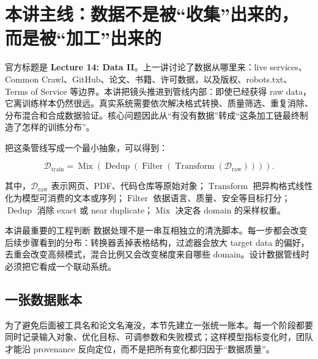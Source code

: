 \section{本讲主线：数据不是被“收集”出来的，而是被“加工”出来的}

官方标题是 \textbf{Lecture 14: Data II}。上一讲讨论了数据从哪里来：live services、Common Crawl、GitHub、论文、书籍、许可数据，以及版权、robots.txt、Terms of Service 等边界。本讲把镜头推进到管线内部：即使已经获得 raw data，它离训练样本仍然很远。真实系统需要依次解决格式转换、质量筛选、重复消除、分布混合和合成数据验证。核心问题因此从“有没有数据”转成“这条加工链最终制造了怎样的训练分布”。

把这条管线写成一个最小抽象，可以得到：

$$
\mathcal{D}_{\mathrm{train}}
=\operatorname{Mix}\!\left(
\operatorname{Dedup}\!\left(
\operatorname{Filter}\!\left(
\operatorname{Transform}(\mathcal{D}_{\mathrm{raw}})
\right)\right)\right).
$$

其中，$\mathcal{D}_{\mathrm{raw}}$ 表示网页、PDF、代码仓库等原始对象；$\operatorname{Transform}$ 把异构格式线性化为模型可消费的文本或序列；$\operatorname{Filter}$ 依据语言、质量、安全等目标打分；$\operatorname{Dedup}$ 消除 exact 或 near duplicate；$\operatorname{Mix}$ 决定各 domain 的采样权重。

\begin{importantbox}{本讲最重要的工程判断}
数据处理不是一串互相独立的清洗脚本。每一步都会改变后续步骤看到的分布：转换器丢掉表格结构，过滤器会放大 target data 的偏好，去重会改变高频模式，混合比例又会改变梯度来自哪些 domain。设计数据管线时必须把它看成一个联动系统。
\end{importantbox}


\subsection{一张数据账本}

为了避免后面被工具名和论文名淹没，本节先建立一张统一账本。每一个阶段都要同时记录输入对象、优化目标、可调参数和失败模式；这样模型指标变化时，团队才能沿 provenance 反向定位，而不是把所有变化都归因于“数据质量”。

